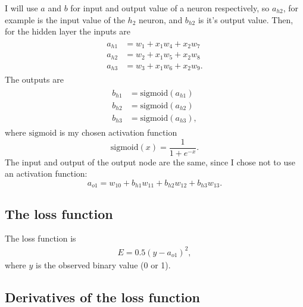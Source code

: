 I will use $a$ and $b$ for input and output value of a neuron respectively, so $a_{h2}$, for example is the input value of the $h_2$ neuron, and $b_{h2}$ is it's output value. Then, for the hidden layer the inputs are
\begin{align}
  \label{eq_q1_hidden_neurons_inputs}
  \begin{split}
    a_{h1} &= w_1 + x_1 w_4 + x_2 w_7 \\
    a_{h2} &= w_2 + x_1 w_5 + x_2 w_8 \\
    a_{h3} &= w_3 + x_1 w_6 + x_2 w_9.
  \end{split}
\end{align}
The outputs are
\begin{align}
  \label{eq_q1_hidden_neurons_outputs}
  \begin{split}
    b_{h1} &= \text{sigmoid}(a_{h1}) \\
    b_{h2} &= \text{sigmoid}(a_{h2}) \\
    b_{h3} &= \text{sigmoid}(a_{h3}),
  \end{split}
\end{align}
where $\text{sigmoid}$ is my chosen activation function
\[
\text{sigmoid}(x) = \frac{1}{1 + e^{-x}}.
\]
The input and output of the output node are the same, since I chose not to use an activation function:
\begin{equation}
  a_{o1} = w_{10} + b_{h1} w_{11} + b_{h2} w_{12} + b_{h3} w_{13}.
  \label{eq_q1_output_value}
\end{equation}


\subsection{The loss function}

The loss function is
\begin{align}
  E = 0.5 (y - a_{o1})^2,
  \label{eq_q1_loss_function}
\end{align}
where $y$ is the observed binary value (0 or 1).


\subsection{Derivatives of the loss function}

